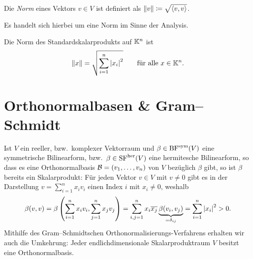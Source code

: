 \begin{definition}
  Die \emph{Norm} eines Vektors $v \in V$ ist definiert als $\left\| v \right\| \coloneqq \sqrt{ \left\langle v, v \right\rangle }$.
\end{definition}

\begin{remark}
  Es handelt sich hierbei um eine Norm im Sinne der Analysis.
\end{remark}

\begin{example}
  Die Norm des Standardskalarprodukts auf $\mathbb{K}^n$ ist
  \[
      \left\| x \right\|
    = \sqrt{ \sum_{i=1}^n \left| x_i \right|^2 }
    \qquad
    \text{für alle $x \in \mathbb{K}^n$}.
  \]
\end{example}






\section{Orthonormalbasen \& Gram--Schmidt}

Ist $V$ ein reeller, bzw.\ komplexer Vektorraum und $\beta \in \operatorname{BF}^{\operatorname{sym}}(V)$ eine symmetrische Bilinearform, bzw.\ $\beta \in \operatorname{SF}^{\operatorname{her}}(V)$ eine hermitesche Bilinearform, so dass es eine Orthonormalbasis $\mathcal{B} = (v_1, \dotsc, v_n)$ von $V$ bezüglich $\beta$ gibt, so ist $\beta$ bereits ein Skalarprodukt:
Für jeden Vektor $v \in V$ mit $v \neq 0$ gibt es in der Darstellung $v = \sum_{i=1}^n x_i v_i$ einen Index $i$ mit $x_i \neq 0$, weshalb
\[
    \beta(v,v)
  = \beta\left( \sum_{i=1}^n x_i v_i, \sum_{j=1}^n x_j v_j \right)
  = \sum_{i,j = 1}^n x_i \overline{x_j} \underbrace{ \beta(v_i, v_j)}_{= \delta_{ij}}
  = \sum_{i=1}^n \left| x_i \right|^2
  > 0.
\]
Mithilfe des Gram--Schmidtschen Orthonormalisierungs-Verfahrens erhalten wir auch die Umkehrung:
Jeder endlichdimensionale Skalarproduktraum $V$ besitzt eine Orthonormalbasis.

